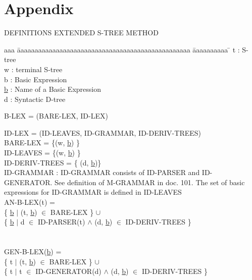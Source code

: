 \section{Appendix}

DEFINITIONS EXTENDED S-TREE METHOD\\

\begin{tabbing}
aaa \= aaaaaaaaaaaaaaaaaaaaaaaaaaaaaaaaaaaaaaaaaaaaaaaaa \= aaaaaaaaaa \= \kill
t   \>: S-tree\\
w   \>: terminal S-tree\\
b   \>: Basic Expression\\
\underline{b} \>: Name of a Basic Expression\\
d   \>: Syntactic D-tree\\
\end{tabbing}


B-LEX = (BARE-LEX, ID-LEX)

ID-LEX = (ID-LEAVES, ID-GRAMMAR, ID-DERIV-TREES)\\


BARE-LEX = \{(w, \underline{b}) \}\\

ID-LEAVES = \{(w, \underline{b}) \}\\

ID-DERIV-TREES = \{ (d, \underline{b})\}\\

ID-GRAMMAR : ID-GRAMMAR consists of ID-PARSER and ID-GENERATOR. See definition
of M-GRAMMAR in doc. 101. The set of basic expressions for ID-GRAMMAR is
defined in ID-LEAVES\\ 

AN-B-LEX(t) =\\

\{ \underline{b} $|$ (t, \underline{b}) $\in$ BARE-LEX \} $\cup$\\

\{ \underline{b} $|$ d $\in$ ID-PARSER(t) 
      $\wedge$ (d,  \underline{b}) $\in$ ID-DERIV-TREES \}\\\\\\


GEN-B-LEX(\underline{b}) =\\

\{ t  $|$ (t, \underline{b}) $\in$ BARE-LEX \} $\cup$\\

\{ t  $|$ t $\in$ ID-GENERATOR(d) $\wedge$ 
(d,  \underline{b}) $\in$ ID-DERIV-TREES \}\\

